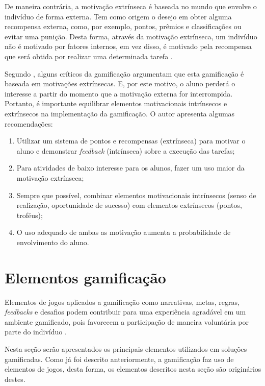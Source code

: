 \documentclass[
	12pt,				%
	oneside,			%
	a4paper,			%
	english,			%
	french,				%
	spanish,			%
	brazil,				%
	]{abntex2}
\begin{document}
De maneira contrária, a motivação extrínseca é baseada no mundo que envolve o indivíduo de forma externa. Tem como origem o desejo em obter alguma recompensa externa, como, por exemplo, pontos, prêmios e classificações ou evitar uma punição. Desta forma, através da motivação extrínseca, um indivíduo não é motivado por fatores internos, em vez disso, é motivado pela recompensa que será obtida por realizar uma determinada tarefa \cite{busarello2016gamificaccao}.

Segundo \citet{andre2018}, alguns críticos da gamificação argumentam que esta gamificação é baseada em motivações extrínsecas. E, por este motivo, o aluno perderá o interesse a partir do momento que a motivação externa for interrompida. Portanto, é importante equilibrar elementos motivacionais intrínsecos e extrínsecos na implementação da gamificação. O autor apresenta algumas recomendações:

\begin{enumerate}
\item Utilizar um sistema de pontos e recompensas (extrínseca) para motivar o aluno e demonstrar \textit{feedback} (intrínseca) sobre a execução das tarefas;
\item Para atividades de baixo interesse para os alunos, fazer um uso maior da motivação extrínseca;
\item Sempre que possível, combinar elementos motivacionais intrínsecos (senso de realização, oportunidade de sucesso) com elementos extrínsecos (pontos, troféus);
\item O uso adequado de ambas as motivação aumenta a probabilidade de envolvimento do aluno.
\end{enumerate}

\section{Elementos gamificação}

Elementos de jogos aplicados a gamificação como narrativas, metas, regras, \textit{feedbacks} e desafios podem contribuir para uma experiência agradável em um ambiente gamificado, pois favorecem a participação de maneira voluntária por parte do indivíduo \cite{busarello2016gamificaccao}.

Nesta seção serão apresentados os principais elementos utilizados em soluções gamificadas. Como já foi descrito anteriormente, a gamificação faz uso de elementos de jogos, desta forma, os elementos descritos nesta seção são originários destes.
\end{document}
